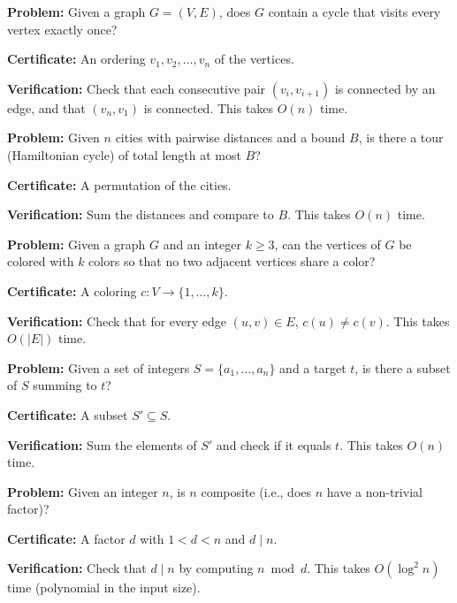 \begin{example}
\textbf{Problem:} Given a graph $G = (V, E)$, does $G$ contain a cycle that visits every vertex exactly once?
\par\textbf{Certificate:} An ordering $v_1, v_2, \ldots, v_n$ of the vertices.
\par\textbf{Verification:} Check that each consecutive pair $(v_i, v_{i+1})$ is connected by an edge, and that $(v_n, v_1)$ is connected. This takes $O(n)$ time.
\end{example}

\begin{example}
\textbf{Problem:} Given $n$ cities with pairwise distances and a bound $B$, is there a tour (Hamiltonian cycle) of total length at most $B$?
\par\textbf{Certificate:} A permutation of the cities.
\par\textbf{Verification:} Sum the distances and compare to $B$. This takes $O(n)$ time.
\end{example}

\begin{example}[$k$-coloring]
\textbf{Problem:} Given a graph $G$ and an integer $k \geq 3$, can the vertices of $G$ be colored with $k$ colors so that no two adjacent vertices share a color?
\par\textbf{Certificate:} A coloring $c: V \to \{1, \ldots, k\}$.
\par\textbf{Verification:} Check that for every edge $(u,v) \in E$, $c(u) \neq c(v)$. This takes $O(|E|)$ time.
\end{example}

\begin{example}
\textbf{Problem:} Given a set of integers $S = \{a_1, \ldots, a_n\}$ and a target $t$, is there a subset of $S$ summing to $t$?
\par\textbf{Certificate:} A subset $S' \subseteq S$.
\par\textbf{Verification:} Sum the elements of $S'$ and check if it equals $t$. This takes $O(n)$ time.
\end{example}

\begin{example}
\textbf{Problem:} Given an integer $n$, is $n$ composite (i.e., does $n$ have a non-trivial factor)?
\par\textbf{Certificate:} A factor $d$ with $1 < d < n$ and $d \mid n$.
\par\textbf{Verification:} Check that $d \mid n$ by computing $n \bmod d$. This takes $O(\log^2 n)$ time (polynomial in the input size).
\end{example}

